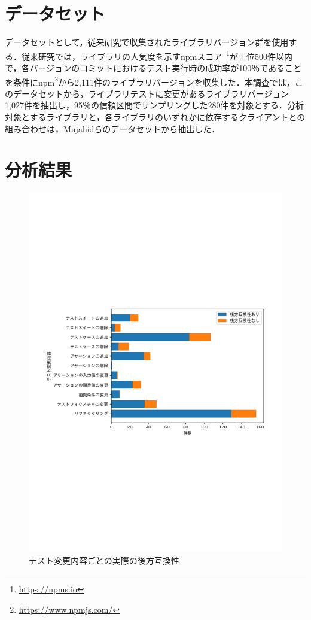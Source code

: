 \documentclass[11pt,dvipdfmx]{jreport}
\begin{document}
\section{データセット}\label{rq1:datasets}
データセットとして，従来研究\cite{matsuda}で収集されたライブラリバージョン群を使用する．従来研究では，ライブラリの人気度を示すnpmスコア~\footnote{\url{https://npms.io}}が上位500件以内で，各バージョンのコミットにおけるテスト実行時の成功率が100％であることを条件にnpm\footnote{\url{https://www.npmjs.com/}}から2,111件のライブラリバージョンを収集した．本調査では，このデータセットから，ライブラリテストに変更があるライブラリバージョン1,027件を抽出し，95％の信頼区間でサンプリングした280件を対象とする．分析対象とするライブラリと，各ライブラリのいずれかに依存するクライアントとの組み合わせは，Mujahidらのデータセットから抽出した．

\section{分析結果}\label{seq:rq1-result}

\begin{figure}[t]
  \centering
  \includegraphics[width=1.0\linewidth]{fig/barh-test-pattern.pdf}
  \caption{テスト変更内容ごとの実際の後方互換性}
  \label{fig:test_pattern}
\end{figure}
\end{document}
